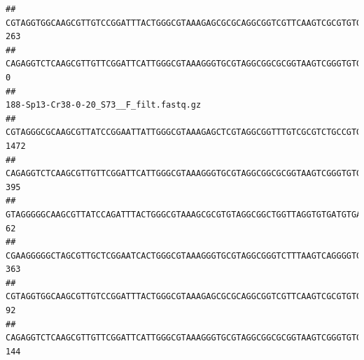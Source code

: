 \documentclass[]{article}
\begin{document}
\begin{verbatim}
## CGTAGGTGGCAAGCGTTGTCCGGATTTACTGGGCGTAAAGAGCGCGCAGGCGGTCGTTCAAGTCGCGTGTGAAAGCCCCCGGCTCAACTGGGGAGGGTCACGCGATACTGATCGACTCGAAGGCAGGAGAGGGTAGTGGAATTCCCGGTGTAGTGGTGAAATGCGTAGATATCGGGAGGAACACCAGTGGCGAAGGCGACTACCTGGCCTGTTCTTGACGCTGAGGCGCGAAAGCTAGGGGAGCAAACG                                     263
## CAGAGGTCTCAAGCGTTGTTCGGATTCATTGGGCGTAAAGGGTGCGTAGGCGGCGCGGTAAGTCGGGTGTGAAATCTCGGGGCTTAACTCCGAAACTGCATTCGATACTGCCGTGCTTGAGGACTGGAGAGGAGACTGGAATTTACGGTGTAGCGGTGAAATGCGTAGATATCGTAAGGAAGACCAGTGGCGAAGGCGGGTCTCTGGACAGTTCCTGACGCTGAGGCACGAAGGCCAGGGGAGCAAACG                                       0
##                                                                                                                                                                                                                                                           188-Sp13-Cr38-0-20_S73__F_filt.fastq.gz
## CGTAGGGCGCAAGCGTTATCCGGAATTATTGGGCGTAAAGAGCTCGTAGGCGGTTTGTCGCGTCTGCCGTGAAAGTCCGGGGCTCAACTCCGGATCTGCGGTGGGTACGGGCAGACTAGAGTGATGTAGGGGAGACTGGAATTCCTGGTGTAGCGGTGAAATGCGCAGATATCAGGAGGAACACCGATGGCGAAGGCAGGTCTCTGGGCATTAACTGACGCTGAGGAGCGAAAGCATGGGGAGCGAACA                                    1472
## CAGAGGTCTCAAGCGTTGTTCGGATTCATTGGGCGTAAAGGGTGCGTAGGCGGCGCGGTAAGTCGGGTGTGAAATCTCGGAGCTTAACTCCGAAACTGCATTCGATACTGCCGTGCTTGAGGACTGGAGAGGAGACTGGAATTTACGGTGTAGCGGTGAAATGCGTAGATATCGTAAGGAAGACCAGTGGCGAAGGCGGGTCTCTGGACAGTTCCTGACGCTGAGGCACGAAGGCCAGGGGAGCAAACG                                     395
## GTAGGGGGCAAGCGTTATCCAGATTTACTGGGCGTAAAGCGCGTGTAGGCGGCTGGTTAGGTGTGATGTGAAATCTTCCGGCTCAACCGGAAAACTGCATTGCAAACCGGCCTGGCTAGAGTGCAGGAGAGGGAAGCGGAATTCCAGGTGTAGCGGTGAAATGCGTAGATATCTGGAGGAACACCAGTGGCGAAGGCGGCTTCCTGGCCTGCAACTGACGCTGAGACGCGAAAGCGTGGGGAGCGAAC                                       62
## CGAAGGGGGCTAGCGTTGCTCGGAATCACTGGGCGTAAAGGGTGCGTAGGCGGGTCTTTAAGTCAGGGGTGAAATCCTGGAGCTCAACTCCAGAACTGCCTTTGATACTGAAGATCTTGAGTTCGGGAGAGGTGAGTGGAACTGCGAGTGTAGAGGTGAAATTCGTAGATATTCGCAAGAACACCAGTGGCGAAGGCGGCTCACTGGCCCGATACTGACGCTGAGGCACGAAAGCGTGGGGAGCAAACA                                     363
## CGTAGGTGGCAAGCGTTGTCCGGATTTACTGGGCGTAAAGAGCGCGCAGGCGGTCGTTCAAGTCGCGTGTGAAAGCCCCCGGCTCAACTGGGGAGGGTCACGCGATACTGATCGACTCGAAGGCAGGAGAGGGTAGTGGAATTCCCGGTGTAGTGGTGAAATGCGTAGATATCGGGAGGAACACCAGTGGCGAAGGCGACTACCTGGCCTGTTCTTGACGCTGAGGCGCGAAAGCTAGGGGAGCAAACG                                      92
## CAGAGGTCTCAAGCGTTGTTCGGATTCATTGGGCGTAAAGGGTGCGTAGGCGGCGCGGTAAGTCGGGTGTGAAATCTCGGGGCTTAACTCCGAAACTGCATTCGATACTGCCGTGCTTGAGGACTGGAGAGGAGACTGGAATTTACGGTGTAGCGGTGAAATGCGTAGATATCGTAAGGAAGACCAGTGGCGAAGGCGGGTCTCTGGACAGTTCCTGACGCTGAGGCACGAAGGCCAGGGGAGCAAACG                                     144

\end{verbatim}
\end{document}
